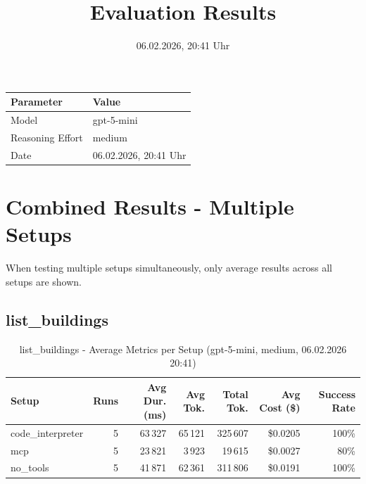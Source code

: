 \documentclass[a4paper,11pt]{article}
\title{Evaluation Results}
\date{06.02.2026, 20:41 Uhr}
\begin{document}
\maketitle

\begin{table}[H]
\centering
\begin{tabular}{l l}
\toprule
\textbf{Parameter} & \textbf{Value} \\
\midrule
Model & gpt-5-mini \\
Reasoning Effort & medium \\
Date & 06.02.2026, 20:41 Uhr \\
\bottomrule
\end{tabular}
\end{table}

\tableofcontents
\clearpage

\section{Combined Results - Multiple Setups}

When testing multiple setups simultaneously, only average results across all setups are shown.

\subsection{list\_buildings}

\begin{table}[H]
\centering
\scriptsize
\caption{list\_buildings - Average Metrics per Setup (gpt-5-mini, medium, 06.02.2026 20:41)}
\label{tab:combined\_list\_buildings\_metrics\_20260206}
\begin{tabular}{l r r r r r r}
\toprule
Setup & Runs & Avg Dur. (ms) & Avg Tok. & Total Tok. & Avg Cost (\$) & Success Rate \\
\midrule
code\_interpreter & 5 & 63\,327 & 65\,121 & 325\,607 & \$0.0205 & 100\% \\
mcp & 5 & 23\,821 & 3\,923 & 19\,615 & \$0.0027 & 80\% \\
no\_tools & 5 & 41\,871 & 62\,361 & 311\,806 & \$0.0191 & 100\% \\
\bottomrule
\end{tabular}
\end{table}
\end{document}
